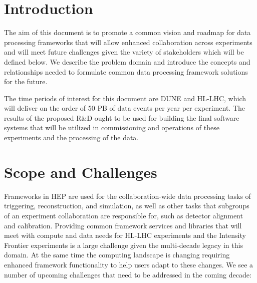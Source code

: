 \documentclass[12pt,a4paper]{article}
\begin{document}
\newpage

\section{Introduction}
The aim of this document is to promote a common vision and roadmap for
data processing frameworks that will allow enhanced collaboration
across experiments and will meet future challenges given the variety
of stakeholders which will be defined below. We describe the problem
domain and introduce the concepts and relationships needed to
formulate common data processing framework solutions for the future.

The time periods of interest for this document are DUNE and HL-LHC,
which will deliver on the order of 50 PB of data events per year per
experiment. The results of the proposed R\&D ought to be used for
building the final software systems that will be utilized in
commissioning and operations of these experiments and the processing
of the data.

\section{Scope and Challenges}
\label{sec:scope-challenges}

Frameworks in HEP are used for the collaboration-wide data processing
tasks of triggering, reconstruction, and simulation, as well as other tasks that
subgroups of an experiment collaboration are responsible for, such as
detector alignment and calibration.
Providing common framework services and libraries that will meet with
compute and data needs for HL-LHC experiments and the Intensity Frontier
experiments is a large challenge given the multi-decade legacy in this
domain. At the same time the computing landscape is changing requiring
enhanced framework functionality to help users adapt to these changes.
We see a number of upcoming challenges that need to be addressed in the
coming decade:
\end{document}
